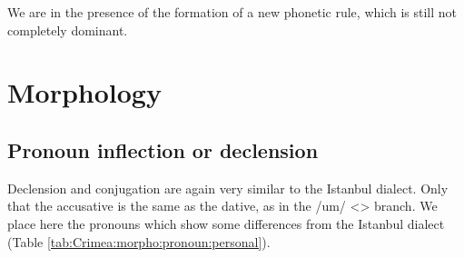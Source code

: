 We are in the presence of the formation of a new phonetic rule, which is still not completely dominant. 

\section{Morphology}
\subsection{Pronoun inflection or declension}

Declension and conjugation are again very similar to the Istanbul dialect. Only that the accusative is the same as the dative, as in the /um/ <> branch. We place here the pronouns which show some differences from the Istanbul dialect (Table \ref{tab:Crimea:morpho:pronoun:personal}). 

\begin{table}[H]
	\centering 
	\caption{Declension paradigm for personal pronouns in the Crimea dialect}
	\label{tab:Crimea:morpho:pronoun:personal}
\end{table}

